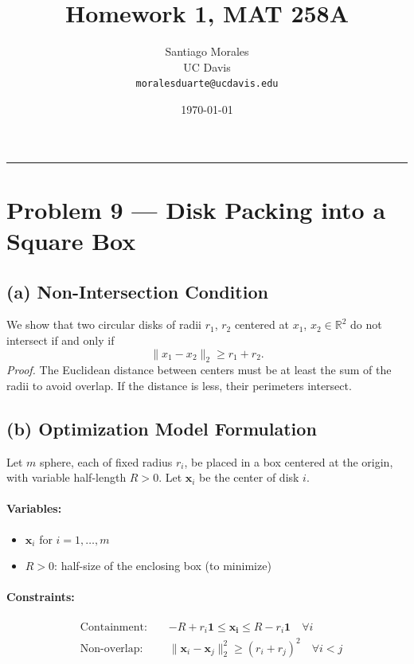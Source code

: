 \documentclass[11pt]{article}
\title{\vspace{-1cm} \textbf{Homework 1, MAT 258A}}
\author{Santiago Morales \\ UC Davis \\ \texttt{moralesduarte@ucdavis.edu}}
\date{\today}
\begin{document}
\maketitle
\vspace{-1em}
\hrule
\vspace{1em}

\section*{Problem 9 — Disk Packing into a Square Box}

\subsection*{(a) Non-Intersection Condition}

We show that two circular disks of radii $r_1$, $r_2$ centered at $x_1$, $x_2 \in \mathbb{R}^2$ do not intersect if and only if
\[
\|x_1 - x_2\|_2 \geq r_1 + r_2.
\]
\textit{Proof.} The Euclidean distance between centers must be at least the sum of the radii to avoid overlap. If the distance is less, their perimeters intersect.

\subsection*{(b) Optimization Model Formulation}

Let $m$ sphere, each of fixed radius $r_i$, be placed in a box centered at the origin, with variable half-length $R > 0$. Let $\mathbf{x}_i$ be the center of disk $i$.

\paragraph{Variables:}
\begin{itemize}[noitemsep]
    \item $\mathbf{x}_i$ for $i = 1, \dots, m$
    \item $R > 0$: half-size of the enclosing box (to minimize)
\end{itemize}

\paragraph{Constraints:}
\begin{align*}
    & \text{Containment: } && -R + r_i\mathbf{1} \leq \mathbf{x_i} \leq R - r_i\mathbf{1}  \quad \forall i \\
    & \text{Non-overlap: } && \|\mathbf{x}_i - \mathbf{x}_j\|_2^2 \geq (r_i + r_j)^2 \quad \forall i < j
\end{align*}
\end{document}
